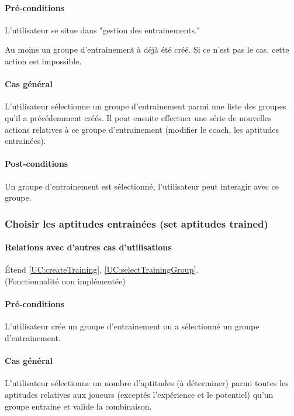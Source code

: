 \paragraph{Pré-conditions}
\begin{list}{}{\leftmargin=1.5em}
\item{L'utilisateur se situe dans "gestion des entrainements."}
\item{Au moins un groupe d'entrainement à déjà été créé. Si ce n'est pas le cas, cette action est impossible.}
\end{list}
\paragraph{Cas général}
L'utilisateur sélectionne un groupe d'entrainement parmi une liste des groupes qu'il a précédemment créés. Il peut ensuite effectuer une série de nouvelles actions relatives à ce groupe d'entrainement (modifier le coach, les aptitudes entrainées).
\paragraph{Post-conditions}
\begin{list}{}{\leftmargin=1.5em}
\item{Un groupe d'entrainement est sélectionné, l'utilisateur peut interagir avec ce groupe.}
\end{list}

\subsubsection{Choisir les aptitudes entrainées (set aptitudes trained)}
\label{UC:chooseAptitudesTrained}
\paragraph{Relations avec d'autres cas d'utilisations}
Étend \ref{UC:createTraining}, \ref{UC:selectTrainingGroup}.
\\(Fonctionnalité non implémentée)
\paragraph{Pré-conditions}
\begin{list}{}{\leftmargin=1.5em}
\item{L'utilisateur crée un groupe d'entrainement ou a sélectionné un groupe d'entrainement.}
\end{list}
\paragraph{Cas général}
L'utilisateur sélectionne un nombre d'aptitudes (à déterminer) parmi toutes les aptitudes relatives aux joueurs (exceptés l'expérience et le potentiel) qu'un groupe entraine et valide la combinaison. 
